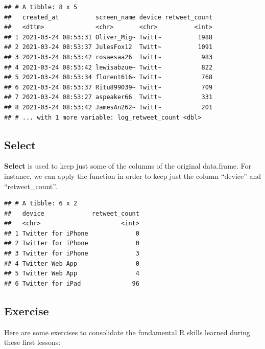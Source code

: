 \documentclass[
]{article}
\newenvironment{Shaded}{\begin{snugshade}}{\end{snugshade}}
\newcommand{\KeywordTok}[1]{\textcolor[rgb]{0.13,0.29,0.53}{\textbf{#1}}}
\newcommand{\NormalTok}[1]{#1}
\newcommand{\OperatorTok}[1]{\textcolor[rgb]{0.81,0.36,0.00}{\textbf{#1}}}
\newcommand{\StringTok}[1]{\textcolor[rgb]{0.31,0.60,0.02}{#1}}
\begin{document}
\begin{verbatim}
## # A tibble: 8 x 5
##   created_at          screen_name device retweet_count
##   <dttm>              <chr>       <chr>          <int>
## 1 2021-03-24 08:53:31 Oliver_Mig~ Twitt~          1988
## 2 2021-03-24 08:53:37 JulesFox12  Twitt~          1091
## 3 2021-03-24 08:53:42 rosaesaa26  Twitt~           983
## 4 2021-03-24 08:53:42 lewisabzue~ Twitt~           822
## 5 2021-03-24 08:53:34 florent616~ Twitt~           768
## 6 2021-03-24 08:53:37 Ritu899039~ Twitt~           709
## 7 2021-03-24 08:53:27 aspeaker66  Twitt~           331
## 8 2021-03-24 08:53:42 JamesAn262~ Twitt~           201
## # ... with 1 more variable: log_retweet_count <dbl>
\end{verbatim}

\hypertarget{select}{%
\subsection{Select}\label{select}}

\textbf{Select} is used to keep just some of the columns of the original data.frame. For instance, we can apply the function in order to keep just the column ``device'' and ``retweet\_count''.

\begin{Shaded}
\end{Shaded}

\begin{verbatim}
## # A tibble: 6 x 2
##   device             retweet_count
##   <chr>                      <int>
## 1 Twitter for iPhone             0
## 2 Twitter for iPhone             0
## 3 Twitter for iPhone             3
## 4 Twitter Web App                0
## 5 Twitter Web App                4
## 6 Twitter for iPad              96
\end{verbatim}

\hypertarget{exercise}{%
\subsection{Exercise}\label{exercise}}

Here are some exercises to consolidate the fundamental R skills learned during these first lessons:
\end{document}
